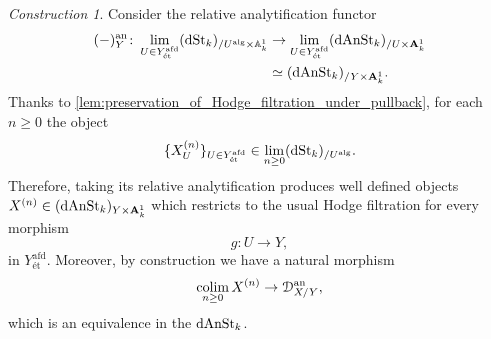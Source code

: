 \documentclass[10pt,a4paper,reqno]{amsart} %
\theoremstyle{plain}
\theoremstyle{definition}
\theoremstyle{remark}
\numberwithin{equation}{section}
\newtheorem{construction}[thm]{Construction}
\begin{document}
\begin{construction}
    Consider the relative analytification functor
        \begin{align*}
            (-)^\mathrm{an}_Y \colon \lim_{U \in Y^{\mathrm{afd}}_{\textrm{\'et}}} (\mathrm{dSt}_k)_{/ U^\mathrm{alg} \times \mathbb A^1_k} & \to \lim_{U \in Y^{\mathrm{afd}}_\textrm{\'et}} (\mathrm{dAnSt}_k)_{/ U \times \mathbf A^1_k}  \\
                                                                                 & \simeq (\mathrm{dAnSt}_k)_{/ Y \times \mathbf A^1_k}.
        \end{align*}
    Thanks to \cref{lem:preservation_of_Hodge_filtration_under_pullback}, for each $n \ge 0$ the object
        \[
            \{ X^{(n)}_{U} \}_{U \in Y^\mathrm{afd}_\textrm{\'et}}  \in \lim_{n \ge 0} (\mathrm{dSt}_k)_{/ U^\mathrm{alg}}.
        \]
    Therefore, taking its relative analytification produces well defined objects $X^{(n)} \in (\mathrm{dAnSt}_k)_{Y \times \mathbf A^1_k}$ which restricts to the usual
    Hodge filtration for every morphism
        \[
            g \colon U \to Y,  
        \]
    in $Y^\mathrm{afd}_\textrm{\'et}$. Moreover, by construction we have a natural morphism
        \[
            \operatorname*{colim}_{n \ge 0} X^{(n)} \to \mathcal D_{X/ Y} ^\mathrm{an},  
        \]
    which is an equivalence in the \infcat $\mathrm{dAnSt}_k$.
\end{construction}













\end{document}

